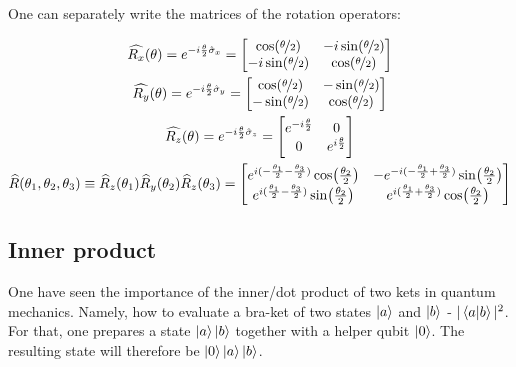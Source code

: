 One can separately write the matrices of the rotation operators:

\begin{gather}
    \widehat{R_x}(\theta) = e^{-i\frac{\theta}{2}\hat{\sigma}_x} = 
    \begin{bmatrix}
      \cos(\nicefrac{\theta}{2}) & -i\sin(\nicefrac{\theta}{2}) \\
      -i\sin(\nicefrac{\theta}{2}) & \cos(\nicefrac{\theta}{2}) \\
    \end{bmatrix} \\
    \widehat{R_y}(\theta) = e^{-i\frac{\theta}{2}\hat{\sigma}_y} = 
    \begin{bmatrix}
      \cos(\nicefrac{\theta}{2}) & -\sin(\nicefrac{\theta}{2}) \\
      -\sin(\nicefrac{\theta}{2}) & \cos(\nicefrac{\theta}{2}) 
    \end{bmatrix}
    \\
    \widehat{R_z}(\theta) = e^{-i\frac{\theta}{2}\hat{\sigma}_z} = 
    \begin{bmatrix}
      e^{-i\frac{\theta}{2}} & 0 \\
      0 & e^{i\frac{\theta}{2}}
    \end{bmatrix}
    \\
    \widehat{R}(\theta_1, \theta_2, \theta_3) \equiv \widehat{R}_z(\theta_1)\widehat{R}_y(\theta_2)\widehat{R}_z(\theta_3) = 
    \begin{bmatrix}
    e^{i(-\frac{\theta_1}{2}-\frac{\theta_3}{2})}\cos(\frac{\theta_2}{2}) &
    -e^{-i(-\frac{\theta_1}{2} + \frac{\theta_3}{2})}\sin(\frac{\theta_2}{2}) \\
    e^{i(\frac{\theta_1}{2}-\frac{\theta_3}{2})}\sin(\frac{\theta_2}{2}) & 
    e^{i(\frac{\theta_1}{2}+\frac{\theta_3}{2})}\cos(\frac{\theta_2}{2})
    \end{bmatrix}
\end{gather}


\subsection*{Inner product}
\label{subsec:inner_product}
One have seen the importance of the inner/dot product of two kets in quantum mechanics.
Namely, how to evaluate a bra-ket of two states $\ket{a}$ and $\ket{b}$ - $|\bra{a}\ket{b}|^2$.
For that, one prepares a state $\ket{a}\ket{b}$ together with a helper qubit $\ket{0}$.
The resulting state will therefore be $\ket{0}\ket{a}\ket{b}$.

